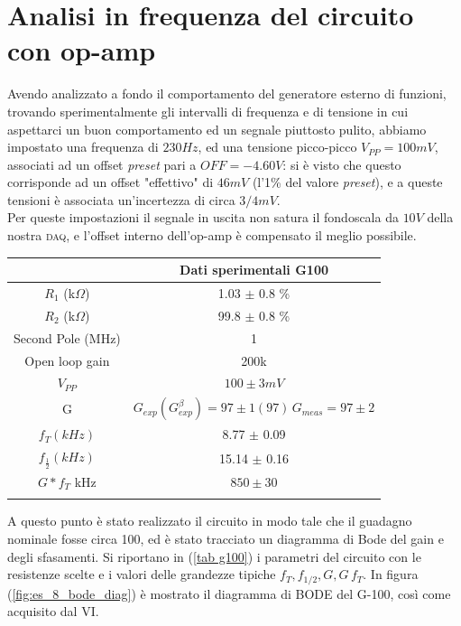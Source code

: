\documentclass[journal, a4paper]{IEEEtran}
\begin{document}
\section{Analisi in frequenza del circuito con op-amp}

Avendo analizzato a fondo il comportamento del generatore esterno di funzioni, trovando sperimentalmente gli intervalli di frequenza e di tensione in cui aspettarci un buon comportamento ed un segnale piuttosto pulito, abbiamo impostato una frequenza di $230 \si{Hz}$, ed una tensione picco-picco $V_{PP} = 100 \si{mV}$, associati ad un offset \textit{preset} pari a $OFF = -4.60 \si{V}$: si è visto che questo corrisponde ad un offset "effettivo" di $46 \si{mV}$ (l'1\% del valore \textit{preset}), e a queste tensioni è associata un'incertezza di circa $3/4 \si{mV} $. \\
Per queste impostazioni il segnale in uscita non satura il fondoscala da $10 \si{V}$ della nostra \textsc{daq}, e l'offset interno dell'op-amp è compensato il meglio possibile.\\

{
\centering
\begin{tabular}{|c|c|}
\hline  &  \textbf{Dati sperimentali G100} \\ 
\hline $R_1$ (k$\Omega$) &  1.03 $\pm$ 0.8 \% \\ 
\hline $R_2$ (k$\Omega$) & 99.8 $\pm$ 0.8 \%  \\ 
\hline Second Pole (MHz) & 1   \\ 
\hline Open loop gain & 200k    \\ 
\hline $V_{PP}$ & $100  \pm 3 \si{mV} $ \\ 
\hline G &  $G_{exp}(G_{exp}^{\beta})  = 97 \pm 1 (97) \, G_{meas} = 97 \pm 2 $ \\ 
\hline $f_T (kHz)$ &  8.77 $\pm$ 0.09 \\
\hline $f_{\frac{1}{2}} (kHz)$ &  15.14 $\pm$ 0.16 \\
\hline $G*f_{T}$ \si{kHz} & $ 850 \pm 30 $\\
\hline
\label{tab g100}
\end{tabular} 

}

A questo punto è stato realizzato il circuito in modo tale che il guadagno nominale fosse circa 100, ed è stato tracciato un diagramma di Bode del gain e degli sfasamenti. Si riportano in (\ref{tab g100}) i parametri del circuito con le resistenze scelte e i valori delle grandezze tipiche $f_T, f_{1/2}, G, G \, f_T$. In figura (\ref{fig:es_8_bode_diag}) è mostrato il diagramma di BODE  del G-100, così come acquisito dal VI.\\
\end{document}
